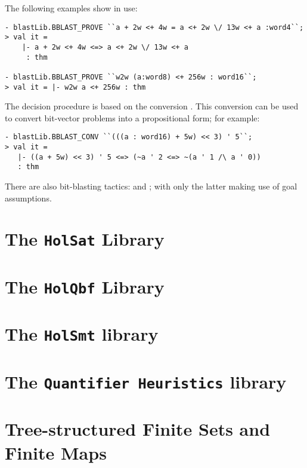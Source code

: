 The following examples show  in use:
\begin{session}
\begin{verbatim}
- blastLib.BBLAST_PROVE ``a + 2w <+ 4w = a <+ 2w \/ 13w <+ a :word4``;
> val it =
    |- a + 2w <+ 4w <=> a <+ 2w \/ 13w <+ a
     : thm

- blastLib.BBLAST_PROVE ``w2w (a:word8) <+ 256w : word16``;
> val it = |- w2w a <+ 256w : thm
\end{verbatim}
\end{session}
The decision procedure  is based on the conversion
. This conversion can be used to convert bit-vector problems
into a propositional form; for example:
\begin{session}
\begin{verbatim}
- blastLib.BBLAST_CONV ``(((a : word16) + 5w) << 3) ' 5``;
> val it =
   |- ((a + 5w) << 3) ' 5 <=> (~a ' 2 <=> ~(a ' 1 /\ a ' 0))
   : thm
\end{verbatim}
\end{session}
There are also bit-blasting tactics:  and ; with only the latter making use of goal assumptions.

\section{The \texttt{HolSat} Library}\label{sec:HolSatLib}



\section{The \texttt{HolQbf} Library}\label{sec:HolQbfLib}



\section{The \texttt{HolSmt} library}\label{sec:HolSmtLib}


\section{The \texttt{Quantifier Heuristics} library}\label{sec:QuantHeuristicsLib}


\section{Tree-structured Finite Sets and Finite Maps}\label{sec:enumfset}




